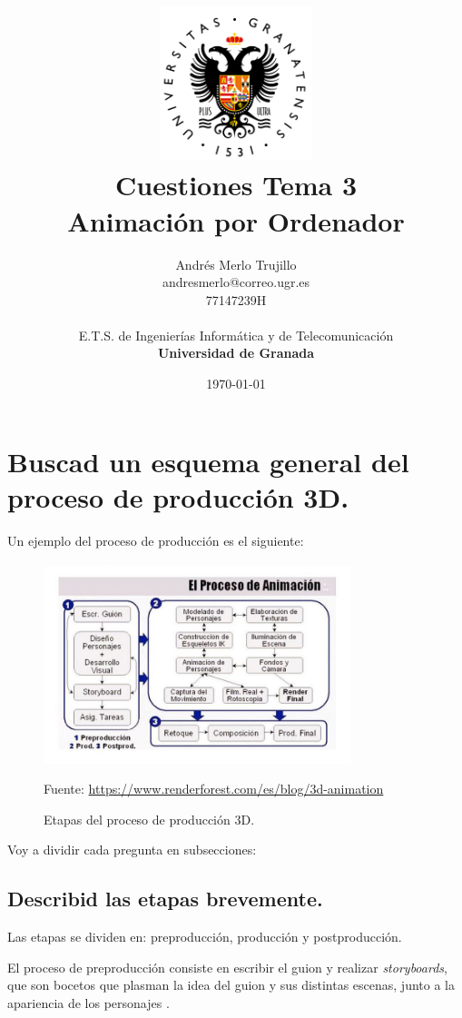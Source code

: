 \documentclass{article}
\title{
\includegraphics[width=1.75in]{imagenes/UGR-Logo.png} \\
\vspace*{1in}
\textbf{Cuestiones Tema 3} \\
Animación por Ordenador \\
\vspace*{0.5in}}
\author{Andrés Merlo Trujillo \\
andresmerlo@correo.ugr.es \\
77147239H \\ 
\vspace*{0.5in} \\
E.T.S. de Ingenierías Informática y de Telecomunicación \\
\textbf{Universidad de Granada}} \date{\today}
\begin{document}
\begin{titlingpage}
\maketitle
\end{titlingpage}

\tableofcontents

\newpage

\pagestyle{fancy}   %

\section{Buscad un esquema general del proceso de producción 3D.}

Un ejemplo del proceso de producción es el siguiente:

\begin{figure}[H]
   \centering
   \includegraphics[width=0.8\textwidth]{imagenes/prod.png}
   \caption{Etapas del proceso de producción 3D.}
   \vspace{10pt}
   \footnotesize{Fuente: \url{https://www.renderforest.com/es/blog/3d-animation}}
\end{figure}


Voy a dividir cada pregunta en subsecciones:

\subsection{Describid las etapas brevemente.}
Las etapas se dividen en: preproducción, producción y postproducción.

\bigskip

El proceso de preproducción consiste en escribir el guion y realizar \textit{storyboards}, que son bocetos que plasman la idea del guion y sus distintas escenas, junto a la apariencia de los personajes \cite{diapos}.
\end{document}

